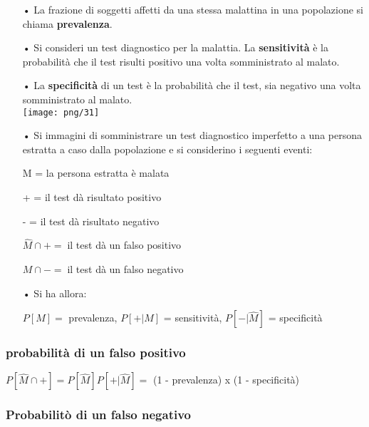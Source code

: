 \documentclass[12pt, letterpaper]{article}
\begin{document}
\begin{itemize}
   \item[•] La frazione di soggetti affetti da una stessa malattina in una popolazione si chiama 
      \textbf{prevalenza}.
   \item[•] Si consideri un test diagnostico per la malattia. La \textbf{sensitività} è la probabilità 
      che il test risulti positivo una volta somministrato al malato.
   \item[•] La \textbf{specificità} di un test è la probabilità che il test, sia negativo una volta somministrato al malato.
      \\
      \texttt{[image: png/31]}
   \item[•] Si immagini di somministrare un test diagnostico imperfetto a una 
      persona estratta a caso dalla popolazione e si considerino i seguenti eventi:
      \\
      \begin{center}M = la persona estratta è malata\end{center}
      \begin{center}+ = il test dà risultato positivo\end{center}
      \begin{center}- = il test dà risultato negativo\end{center}
      \begin{center}$\hat{M} \cap + =\; $il test dà un falso positivo\end{center}
      \begin{center}$M \cap - =\; $il test dà un falso negativo\end{center}
   \item[•] Si ha allora:
      \begin{center}$P[M] =$ prevalenza, $P[+|M]$ = sensitività, $P[-|\hat{M}]$ = specificità\end{center}
\end{itemize}

\subsubsection{probabilità di un falso positivo}

$P[\hat{M} \cap +] = P[\hat{M}]P[+|\hat{M}] =$ (1 - prevalenza) x (1 - specificità)

\subsubsection{Probabilitò di un falso negativo}
\end{document}
